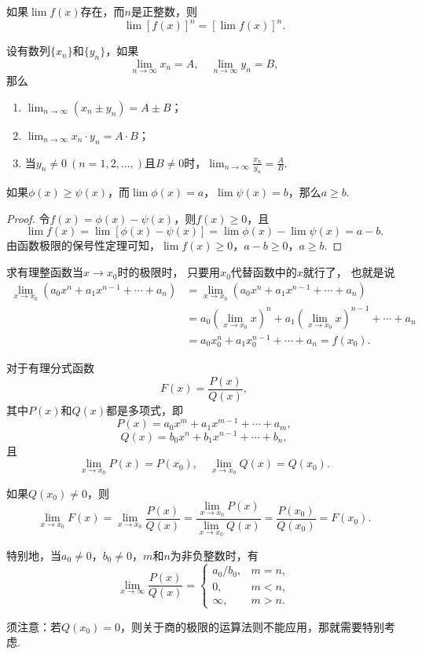 \begin{corollary}
如果\(\lim f(x)\)存在，而\(n\)是正整数，则\[\lim [f(x)]^n = [\lim f(x)]^n.\]
\end{corollary}

\begin{theorem}
设有数列\(\{x_n\}\)和\(\{y_n\}\)，如果\[
\lim_{n\to\infty}x_n = A,
\quad
\lim_{n\to\infty}y_n = B,
\]那么\begin{enumerate}
\item \(\lim_{n\to\infty}{(x_n \pm y_n)}=A \pm B\)；
\item \(\lim_{n\to\infty}{x_n \cdot y_n}=A \cdot B\)；
\item 当\(y_n \neq 0\ (n=1,2,\dotsc,)\)且\(B \neq 0\)时，\(\lim_{n\to\infty}{\frac{x_n}{y_n}}=\frac{A}{B}\).
\end{enumerate}
\end{theorem}

\begin{theorem}
如果\(\phi(x) \geq \psi(x)\)，而\(\lim \phi(x)=a\)，\(\lim \psi(x)=b\)，那么\(a \geq b\).
\begin{proof}
令\(f(x) = \phi(x) - \psi(x)\)，则\(f(x) \geq 0\)，且\[
\lim f(x) = \lim[\phi(x) - \psi(x)]
= \lim \phi(x) - \lim \psi(x)
= a - b.
\]由函数极限的保号性定理可知，\(\lim f(x) \geq 0\)，\(a - b \geq 0\)，\(a \geq b\).
\end{proof}
\end{theorem}

\begin{example}\label{example:极限.有理整函数在一点的极限}
求有理整函数当\(x\to x_0\)时的极限时，
只要用\(x_0\)代替函数中的\(x\)就行了，
也就是说
\def\lx{\left(\lim_{x \to x_0} x\right)}
\begin{align*}
	\lim_{x \to x_0} (a_0 x^n + a_1 x^{n-1} + \dotsb + a_n)
	&= \lim_{x \to x_0}{(a_0 x^n + a_1 x^{n-1} + \dotsb + a_n)} \\
	&= a_0 \lx^n + a_1 \lx^{n-1} + \dotsb + a_n \\
	&= a_0 x_0^n + a_1 x_0^{n-1} + \dotsb + a_n
	= f(x_0).
\end{align*}
\end{example}

\begin{example}
对于有理分式函数\[
F(x) = \frac{P(x)}{Q(x)},
\]其中\(P(x)\)和\(Q(x)\)都是多项式，即\[
P(x) = a_0 x^m + a_1 x^{m-1} + \dotsb + a_m,
\]\[
Q(x) = b_0 x^n + b_1 x^{n-1} + \dotsb + b_n,
\]且\[
\lim_{x \to x_0} P(x) = P(x_0),
\quad
\lim_{x \to x_0} Q(x) = Q(x_0).
\]

如果\(Q(x_0) \neq 0\)，则\[
\lim_{x \to x_0} F(x)
= \lim_{x \to x_0} \frac{P(x)}{Q(x)}
= \frac{\lim_{x \to x_0} P(x)}{\lim_{x \to x_0} Q(x)}
= \frac{P(x_0)}{Q(x_0)}
= F(x_0).
\]

特别地，当\(a_0\neq0\)，\(b_0\neq0\)，\(m\)和\(n\)为非负整数时，有
\[
\lim_{x\to\infty}\frac{P(x)}{Q(x)} = \left\{ \begin{array}{cl}
a_0/b_0, & m=n, \\
0, & m<n, \\
\infty, & m>n.
\end{array} \right.
\]
\end{example}
须注意：若\(Q(x_0) = 0\)，则关于商的极限的运算法则不能应用，那就需要特别考虑.

